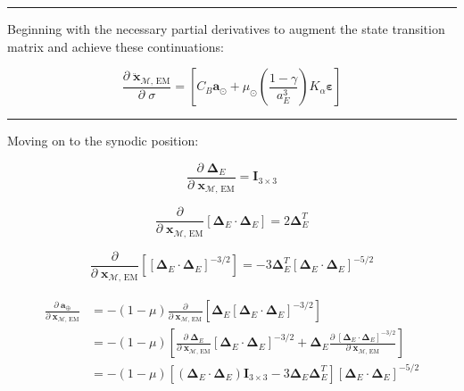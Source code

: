 \documentclass[]{article}
\newcommand{\pd}[2]{\frac{\partial\;#1}{\partial\;#2}}
\newcommand{\pddown}[2]{\frac{\partial}{\partial\;#2} \left[ #1 \right] }
\begin{document}
	\hrule \vspace{1em}
	
	Beginning with the necessary partial derivatives to augment the state transition matrix and achieve these continuations:
	
	\begin{equation}
		\pd{\ddot{\mathbf{x}}_{\mathcal{M}\text{, EM}}}{\sigma} = \left[ C_B  \mathbf{a}_{\odot} + \mu_\odot \left(\frac{1-\gamma}{a_E^3}\right) K_\alpha \boldsymbol{\varepsilon} \right]
	\end{equation}
	
	\hrule \vspace{1em}
	
	Moving on to the synodic position:
	
	\begin{equation*}
		\pd{\boldsymbol{\Delta}_E}{\mathbf{x}_{\mathcal{M}\text{, EM}}} = \mathbf{I}_{3\times 3}
	\end{equation*}
	
	\begin{equation*}
		\pddown{\boldsymbol{\Delta}_E \cdot \boldsymbol{\Delta}_E}{\mathbf{x}_{\mathcal{M}\text{, EM}}} = 2 \boldsymbol{\Delta}_E^T
	\end{equation*}
	
	\begin{equation*}
		\pddown{ [\boldsymbol{\Delta}_E \cdot \boldsymbol{\Delta}_E ]^{-3/2} }{\mathbf{x}_{\mathcal{M}\text{, EM}}} = -3 \boldsymbol{\Delta}_E^T [\boldsymbol{\Delta}_E \cdot \boldsymbol{\Delta}_E ]^{-5/2}
	\end{equation*}
	
	\begin{align}
	\begin{split}
		\pd{\mathbf{a}_{\oplus}}{ \mathbf{x}_{\mathcal{M}\text{, EM}} } 
		&= -(1-\mu) \pddown{ \boldsymbol{\Delta}_E [\boldsymbol{\Delta}_E\cdot\boldsymbol{\Delta}_E]^{-3/2} }{ \mathbf{x}_{\mathcal{M}\text{, EM}} } \\
		&= -(1-\mu) \left[ \pd{ \boldsymbol{\Delta}_E}{ \mathbf{x}_{\mathcal{M}\text{, EM}} }[\boldsymbol{\Delta}_E\cdot\boldsymbol{\Delta}_E]^{-3/2} + \boldsymbol{\Delta}_E \pd{ [\boldsymbol{\Delta}_E\cdot\boldsymbol{\Delta}_E]^{-3/2} }{ \mathbf{x}_{\mathcal{M}\text{, EM}} } \right] \\
		&= -(1-\mu) \left[ (\boldsymbol{\Delta}_E\cdot\boldsymbol{\Delta}_E) \mathbf{I}_{3\times 3} - 3 \boldsymbol{\Delta}_E \boldsymbol{\Delta}_E^T \right] [\boldsymbol{\Delta}_E \cdot \boldsymbol{\Delta}_E ]^{-5/2} \\
	\end{split}
	\end{align}
	
\end{document}

